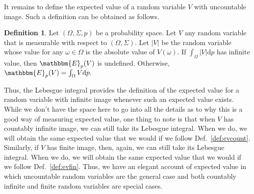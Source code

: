 \documentclass[11pt]{article}
\theoremstyle{definition}
\newtheorem{definition}[theorem]{Definition}
\theoremstyle{remark}
\begin{document}
It remains to define the expected value of a random variable $V$ with uncountable image. Such a definition can be obtained as follows. 
\begin{definition}
    Let $(\Omega,\Sigma,p)$ be a probability space. Let $V$ any random variable that is measurable with respect to $(\Omega,\Sigma)$. Let $|V|$ be the random variable whose value for any $\omega\in\Omega$ is the absolute value of $V(\omega)$. If $\int_{\Omega}|V|\textrm{d}p$ has infinite value, then $\mathbbm{E}_{p}(V)$ is undefined. Otherwise, $\mathbbm{E}_{p}(V)=\int_{\Omega}V\textrm{d}p.$
\end{definition}
\noindent
Thus, the Lebesgue integral provides the definition of the expected value for a random variable with infinite image whenever such an expected value exists. While we don't have the space here to go into all the details as to why this is a good way of measuring expected value, one thing to note is that when $V$ has countably infinite image, we can still take its Lebesgue integral. When we do, we will obtain the same expected value that we would if we follow Def.~\ref{def:evcount}. Similarly, if $V$ has finite image, then, again, we can still take its Lebesgue integral. When we do, we will obtain the same expected value that we would if we follow Def.~\ref{def:evfin}. Thus, we have an elegant account of expected value in which uncountable random variables are the general case and both countably infinite and finite random variables are special cases.\par 
\end{document}
